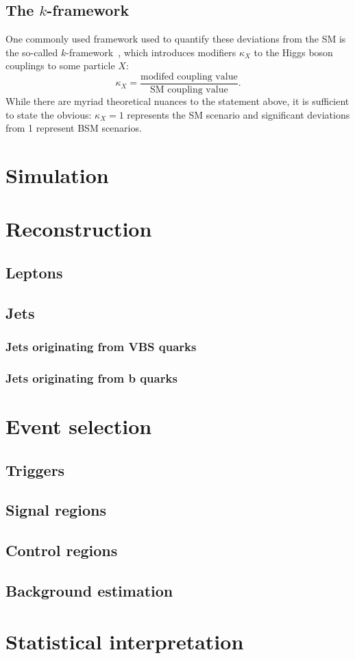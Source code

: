 \subsection{The $k$-framework}
One commonly used framework used to quantify these deviations from the SM is the so-called $k$-framework~\cite{KFrame}, which introduces modifiers $\kappa_X$ to the Higgs boson couplings to some particle $X$:
\begin{equation}
    \kappa_X = \frac{\text{modifed coupling value}}{\text{SM coupling value}}.
\end{equation}
While there are myriad theoretical nuances to the statement above, it is sufficient to state the obvious: $\kappa_X = 1$ represents the SM scenario and significant deviations from 1 represent BSM scenarios. 

\section{Simulation}

\section{Reconstruction}
\subsection{Leptons}
\subsection{Jets}
\subsubsection{Jets originating from VBS quarks}
\subsubsection{Jets originating from b quarks}

\section{Event selection}
\subsection{Triggers}
\subsection{Signal regions}
\subsection{Control regions}
\subsection{Background estimation}

\section{Statistical interpretation}
